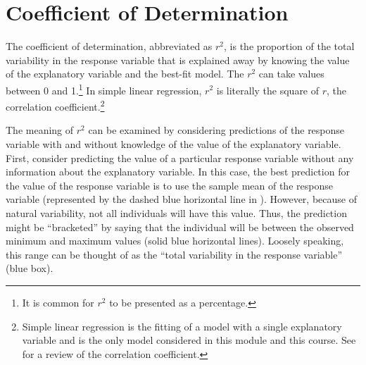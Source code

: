 \documentclass[10pt,openany]{book}\usepackage[]{graphicx}\usepackage[]{color}
\begin{document}

\section{Coefficient of Determination}
\vspace{-12pt}
The coefficient of determination, abbreviated as $r^{2}$, is the proportion of the total variability in the response variable that is explained away by knowing the value of the explanatory variable and the best-fit model.  The $r^{2}$ can take values between 0 and 1.\footnote{It is common for $r^{2}$ to be presented as a percentage.}  In simple linear regression, $r^{2}$ is literally the square of $r$, the correlation coefficient.\footnote{Simple linear regression is the fitting of a model with a single explanatory variable and is the only model considered in this module and this course. See  for a review of the correlation coefficient.}


\vspace{-12pt}

The meaning of $r^{2}$ can be examined by considering predictions of the response variable with and without knowledge of the value of the explanatory variable.  First, consider predicting the value of a particular response variable without any information about the explanatory variable.  In this case, the best prediction for the value of the response variable is to use the sample mean of the response variable (represented by the dashed blue horizontal line in ).  However, because of natural variability, not all individuals will have this value.  Thus, the prediction might be ``bracketed'' by saying that the individual will be between the observed minimum and maximum values (solid blue horizontal lines).  Loosely speaking, this range can be thought of as the ``total variability in the response variable'' (blue box).
\end{document}
